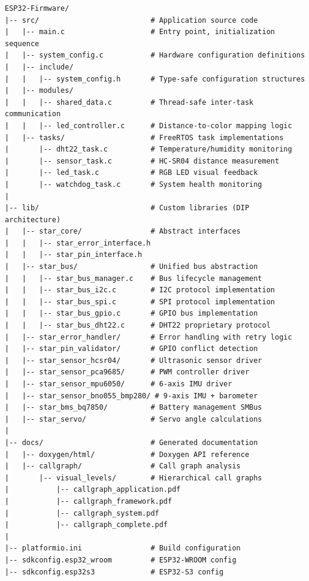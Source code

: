 \begin{lstlisting}[basicstyle=\tiny\ttfamily, frame=single, caption={ESP32 Firmware Repository Structure}, float=h]
ESP32-Firmware/
|-- src/                          # Application source code
|   |-- main.c                    # Entry point, initialization sequence
|   |-- system_config.c           # Hardware configuration definitions
|   |-- include/
|   |   |-- system_config.h       # Type-safe configuration structures
|   |-- modules/
|   |   |-- shared_data.c         # Thread-safe inter-task communication
|   |   |-- led_controller.c      # Distance-to-color mapping logic
|   |-- tasks/                    # FreeRTOS task implementations
|       |-- dht22_task.c          # Temperature/humidity monitoring
|       |-- sensor_task.c         # HC-SR04 distance measurement
|       |-- led_task.c            # RGB LED visual feedback
|       |-- watchdog_task.c       # System health monitoring
|
|-- lib/                          # Custom libraries (DIP architecture)
|   |-- star_core/                # Abstract interfaces
|   |   |-- star_error_interface.h
|   |   |-- star_pin_interface.h
|   |-- star_bus/                 # Unified bus abstraction
|   |   |-- star_bus_manager.c    # Bus lifecycle management
|   |   |-- star_bus_i2c.c        # I2C protocol implementation
|   |   |-- star_bus_spi.c        # SPI protocol implementation
|   |   |-- star_bus_gpio.c       # GPIO bus implementation
|   |   |-- star_bus_dht22.c      # DHT22 proprietary protocol
|   |-- star_error_handler/       # Error handling with retry logic
|   |-- star_pin_validator/       # GPIO conflict detection
|   |-- star_sensor_hcsr04/       # Ultrasonic sensor driver
|   |-- star_sensor_pca9685/      # PWM controller driver
|   |-- star_sensor_mpu6050/      # 6-axis IMU driver
|   |-- star_sensor_bno055_bmp280/ # 9-axis IMU + barometer
|   |-- star_bms_bq7850/          # Battery management SMBus
|   |-- star_servo/               # Servo angle calculations
|
|-- docs/                         # Generated documentation
|   |-- doxygen/html/             # Doxygen API reference
|   |-- callgraph/                # Call graph analysis
|       |-- visual_levels/        # Hierarchical call graphs
|           |-- callgraph_application.pdf
|           |-- callgraph_framework.pdf
|           |-- callgraph_system.pdf
|           |-- callgraph_complete.pdf
|
|-- platformio.ini                # Build configuration
|-- sdkconfig.esp32_wroom         # ESP32-WROOM config
|-- sdkconfig.esp32s3             # ESP32-S3 config
\end{lstlisting}


